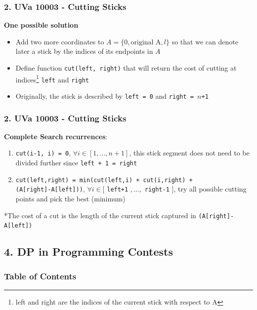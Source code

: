 \documentclass{beamer}
\begin{document}
\begin{frame}[fragile]
\frametitle{2. UVa 10003 - Cutting Sticks}

\textbf{One possible solution}

\begin{itemize}
    \item Add two more coordinates to $A = \{0, \text{original A}, l\}$ so that we can denote later a stick by the indices of its endpoints in $A$
    
    \pause
    \item Define function \verb|cut(left, right)| that will return the cost of cutting at indices\footnote{left and right are the indices of the current stick with respect to A} \verb|left| and \verb|right|
    
    \pause
    \item Originally, the stick is described by \verb|left = 0| and \verb|right = |$n$\verb|+1|
\end{itemize}

\end{frame}

\begin{frame}[fragile]
\frametitle{2. UVa 10003 - Cutting Sticks}

\textbf{Complete Search recurrences}:

\begin{enumerate}
    \item \verb|cut(i-1, i) = 0|, $\forall i \in [1,\ldots,n+1]$, this stick segment does not need to be divided further since \verb|left + 1 = right|
    \item \verb|cut(left,right) = min(cut(left,i) + cut(i,right) +| \\ \verb|(A[right]-A[left]))|, $\forall i \in [$ \verb|left+1| $,\ldots,$ \verb|right-1| $]$, try all possible cutting points and pick the best (minimum)
\end{enumerate}

\vspace{0.3cm}
\color{blue}*The cost of a cut is the length of the current stick captured in \verb|(A[right]-A[left])|\color{black}

\end{frame}


\subsection{4. DP in Programming Contests}
\begin{frame}
	\frametitle{Table of Contents}
\end{frame}
\end{document}
